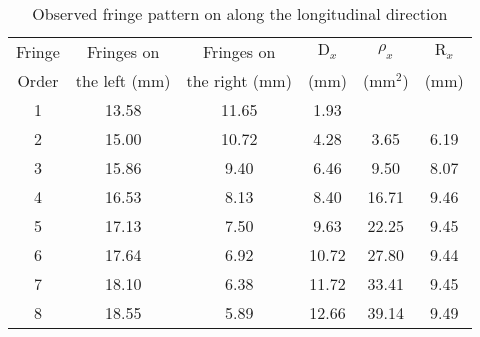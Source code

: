 \begin{table}[H]
    \centering
    \begin{tabular}{|c|c|c|c|c|c|}
        \hline
        Fringe    & Fringes on     & Fringes on       & $\text{D}_x$        & $\rho_x$   & $\text{R}_x$    \\ 
        Order     & the left (mm)  & the right (mm)   & (mm)       & ($\text{mm}^2$)   & (mm)   \\ \hline
         1 & 13.58 & 11.65 &  1.93 &      &    \\
         2 & 15.00 & 10.72 &  4.28 &  3.65 & 6.19 \\
         3 & 15.86 &  9.40 &  6.46 &  9.50 & 8.07 \\
         4 & 16.53 &  8.13 &  8.40 & 16.71 & 9.46 \\
         5 & 17.13 &  7.50 &  9.63 & 22.25 & 9.45 \\
         6 & 17.64 &  6.92 & 10.72 & 27.80 & 9.44 \\
         7 & 18.10 &  6.38 & 11.72 & 33.41 & 9.45 \\
         8 & 18.55 &  5.89 & 12.66 & 39.14 & 9.49 \\
 \hline
       \end{tabular}
    \caption{Observed fringe pattern on along the longitudinal direction}
    \label{tab:1}
\end{table}